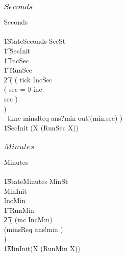 \subsubsection{$Seconds$}
\begin{circus}
\circprocess Seconds \circdef\ \\
\circbegin\\
\t1\circstate StateSeconds  SecSt\\
\t1 SecInit \\
\t1 IncSec \\
\t1 RunSec \circdef
\\\t2
(
(
tick \then \lschexpract IncSec \rschexpract \circseq\\
    (
      \circif  sec = 0 \circthen inc \then \Skip\\
      \circelse sec  \circthen \Skip \circfi
    )\\
    )\\
  \extchoice~time \then minsReq \then ans?min \then out!(min,sec)
      \then \Skip
)\\
 \t1\circspot \lschexpract SecInit \rschexpract \circseq (\circmu X \circspot (RunSec \circseq X))\\
\circend
\end{circus}
\subsubsection{$Minutes$}

\begin{circus}
\circprocess Minutes \circdef\\\ \circbegin\\
\t1\circstate StateMinutes  MinSt\\
MinInit \\
IncMin \\
\t1 RunMin \circdef\\\t2
(
  (inc \then \lschexpract IncMin\rschexpract )\\
  \extchoice (minsReq \then ans!min \then \Skip)\\
)\\
 \t1\circspot \lschexpract MinInit\rschexpract  \circseq (\circmu X \circspot (RunMin \circseq X))\\
\circend
\end{circus}
%


